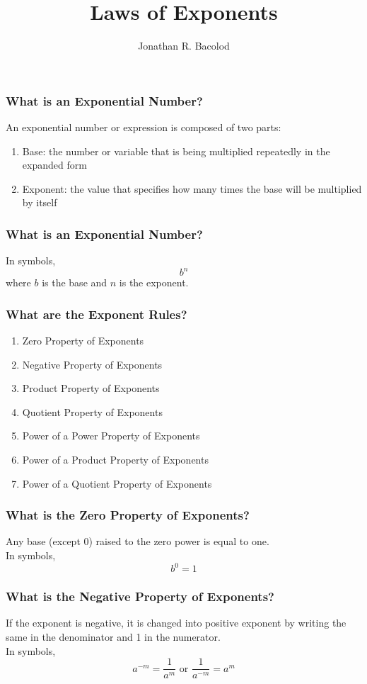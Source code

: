 \documentclass[14pt]{beamer}
\title[] {Laws of Exponents}
\author{Jonathan R. Bacolod}
\institute[SHS]{Sauyo High School}
\date{}
\begin{document}
	\frame{\titlepage}
	
	\begin{frame}
		\frametitle{What is an Exponential Number?}
		An exponential number or expression is composed of two parts:
		\begin{enumerate}
			\item<1-> Base: the number or variable that is being multiplied repeatedly in the expanded form
			\item<2-> Exponent: the value that specifies how many times the base will be multiplied by itself
		\end{enumerate}
	\end{frame}
	
	\begin{frame}
		\frametitle{What is an Exponential Number?}
		In symbols, \[ b^n \] where $ b $ is the base and $ n $ is the exponent.
	\end{frame}

    \begin{frame}
    	\frametitle{What are the Exponent Rules?}
    	
    	\begin{enumerate}
    		\item<1-> Zero Property of Exponents
    		\item<2-> Negative Property of Exponents
    		\item<3-> Product Property of Exponents
    		\item<4-> Quotient Property of Exponents
    		\item<5-> Power of a Power Property of Exponents
    		\item<6-> Power of a Product Property of Exponents
    		\item<7-> Power of a Quotient Property of Exponents
    	\end{enumerate}
    \end{frame}
	
    \begin{frame}
    	\frametitle{What is the Zero Property of Exponents?}
    	Any base (except 0) raised to the zero power is equal to one.\\
    	In symbols, \[ b^0 = 1 \]
    \end{frame}

    \begin{frame}
    	\frametitle{What is the Negative Property of Exponents?}
    	If the exponent is negative, it is changed into positive exponent by writing the same in the denominator and 1 in the numerator. \\
    	In symbols, \[ a^{-m} = \frac{1}{a^m} \text{ or } \frac{1}{a^{-m}} = a^{m} \]
    	
    \end{frame}
\end{document}
